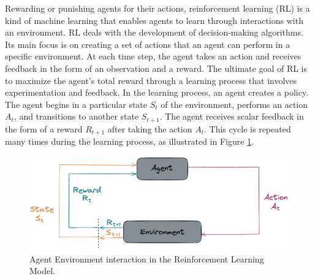 \documentclass[12pt,oneside]{article}
\begin{document}
Rewarding or punishing agents for their actions, reinforcement learning (RL) is a kind of machine learning that enables agents to learn through interactions with an environment. RL deals with the development of decision-making algorithms. Its main focus is on creating a set of actions that an agent can perform in a specific environment. At each time step, the agent takes an action and receives feedback in the form of an observation and a reward. The ultimate goal of RL is to maximize the agent's total reward through a learning process that involves experimentation and feedback. 
In the learning process, an agent creates a policy. The agent begins in a particular state $S_t$ of the environment, performs an action $A_t$, and transitions to another state $S_{t+1}$. The agent receives scalar feedback in the form of a reward $R_{t+1}$ after taking the action $A_t$. This cycle is repeated many times during the learning process, as illustrated in Figure \ref{fig:mdp1}.
\begin{figure}[H]
\centering
\includegraphics[width=0.7\linewidth]{mdp1}
\caption{Agent Environment interaction in the Reinforcement Learning Model.}
\label{fig:mdp1}
\end{figure}
\end{document}
